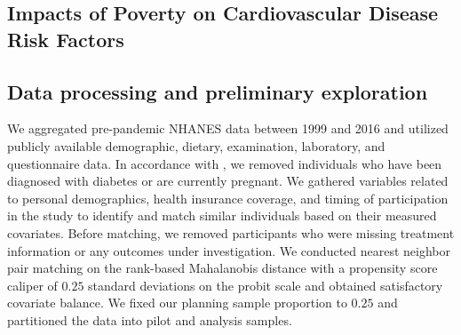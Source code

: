 \documentclass[12pt,leqno,titlepage]{amsart}
\newcommand{\1}{\mathbbm{1}}
\begin{document}
\begin{bibunit}
\section{Impacts of Poverty on Cardiovascular Disease Risk Factors} \label{sec: application}


\subsection{Data processing and preliminary exploration} \label{data-exam}



We aggregated pre-pandemic NHANES data between 1999 and 2016 and utilized publicly available demographic, dietary, examination, laboratory, and questionnaire data. In accordance with \cite{ali2011household}, we removed individuals who have been diagnosed with diabetes or are currently pregnant. We gathered variables related to personal demographics, health insurance coverage, and timing of participation in the study to identify and match similar individuals based on their measured covariates.
Before matching, we removed participants who were missing treatment information or any outcomes under investigation. We conducted nearest neighbor pair matching on the rank-based Mahalanobis distance with a propensity score caliper of $0.25$ standard deviations on the probit scale and obtained satisfactory covariate balance. %
We fixed our planning sample proportion to $0.25$ and partitioned the data into pilot and analysis samples.






\end{bibunit}
\end{document}
